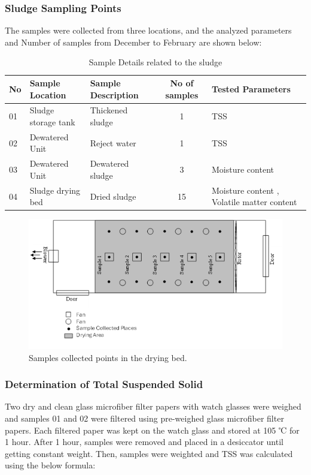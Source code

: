 \subsubsection{Sludge Sampling Points}
The samples were collected from three locations, and the analyzed parameters and Number of samples from December to February are shown below:

\begin{table}[H]
\caption{Sample Details related to the sludge}
\centering
\begin{tabular}{|l|l|l|c|p{4 cm}|}
\hline
No & Sample Location & Sample Description & No of samples & Tested Parameters \\
\hline
01 & Sludge storage tank & Thickened sludge & 1 & TSS \\
\hline
02 & Dewatered Unit & Reject water & 1 & TSS \\
\hline
03 & Dewatered Unit & Dewatered sludge & 3 & Moisture content \\
\hline
04 & Sludge drying bed & Dried sludge & 15 & Moisture content , Volatile matter content \\
\hline
\end{tabular}

\label{table:sample_details}
\end{table}

\begin{figure}[H]
\centering
\includegraphics[width=1\linewidth]{material_and_methodology/samples_collected_points_in_the_drying_bed.png}
\caption{Samples collected points in the drying bed.}
\label{fig:samples_collected_points}
\end{figure}


\subsubsection{Determination of Total Suspended Solid}
Two dry and clean glass microfiber filter papers with watch glasses were weighed and samples 01 and 02 were filtered using pre-weighed glass microfiber filter papers. Each filtered paper was kept on the watch glass and stored at 105 ℃ for 1 hour. After 1 hour, samples were removed and placed in a desiccator until getting constant weight. Then, samples were weighted and \ac{TSS} was calculated using the below formula:

